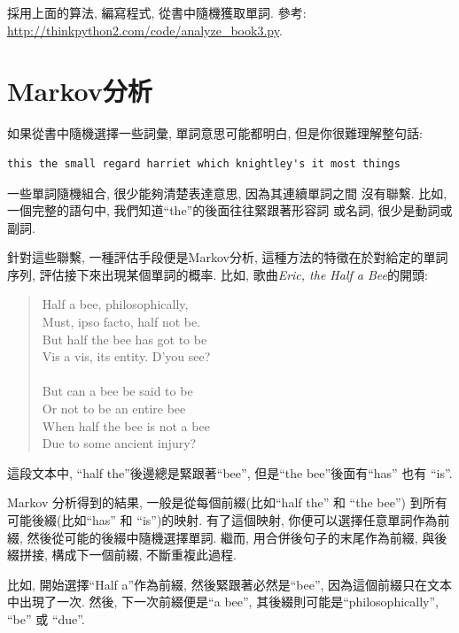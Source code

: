 \documentclass[10pt]{book}
\begin{document}
\begin{exercise}
\label{randhist}

採用上面的算法, 編寫程式, 從書中隨機獲取單詞. 參考:
\url{http://thinkpython2.com/code/analyze_book3.py}.

\end{exercise}



\section{Markov分析}
\label{markov}
如果從書中隨機選擇一些詞彙, 單詞意思可能都明白, 
但是你很難理解整句話:

\begin{verbatim}
this the small regard harriet which knightley's it most things
\end{verbatim}
%
一些單詞隨機組合, 很少能夠清楚表達意思, 因為其連續單詞之間
沒有聯繫. 比如, 一個完整的語句中, 我們知道``the''的後面往往緊跟著形容詞
或名詞, 很少是動詞或副詞. 

針對這些聯繫, 一種評估手段便是Markov分析, 這種方法的特徵在於對給定的單詞序列, 
評估接下來出現某個單詞的概率. 比如, 歌曲{\em Eric, the Half a Bee}的開頭:

\begin{quote}
Half a bee, philosophically, \\
Must, ipso facto, half not be. \\
But half the bee has got to be \\
Vis a vis, its entity. D'you see? \\
\\
But can a bee be said to be \\
Or not to be an entire bee \\
When half the bee is not a bee \\
Due to some ancient injury? \\
\end{quote}
%
這段文本中, ``half the''後邊總是緊跟著``bee'',
但是``the bee''後面有``has'' 也有 ``is''.

Markov 分析得到的結果, 一般是從每個前綴(比如``half the'' 和 ``the bee'')
到所有可能後綴(比如``has'' 和 ``is'')的映射.
有了這個映射, 你便可以選擇任意單詞作為前綴, 
然後從可能的後綴中隨機選擇單詞. 繼而, 用合併後句子的末尾作為前綴, 與後綴拼接, 
構成下一個前綴, 不斷重複此過程. 

比如, 開始選擇``Half a''作為前綴, 然後緊跟著必然是``bee'', 
因為這個前綴只在文本中出現了一次. 然後, 下一次前綴便是``a bee'', 
其後綴則可能是``philosophically'', ``be'' 或 ``due''.
\end{document}
